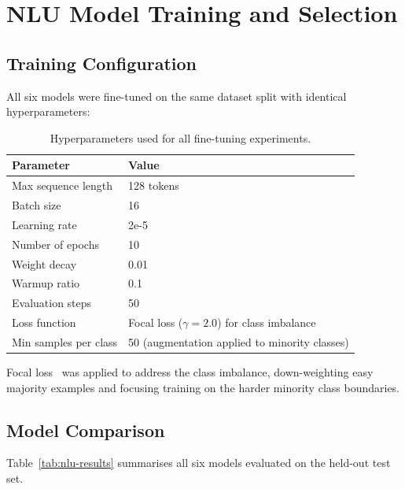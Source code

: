 \section{NLU Model Training and Selection}
\label{sec:results-nlu}

\subsection{Training Configuration}

All six models were fine-tuned on the same dataset split with identical
hyperparameters:

\begin{table}[H]
\centering
\caption{Hyperparameters used for all fine-tuning experiments.}
\label{tab:hyperparams}
\small
\begin{tabularx}{\textwidth}{Y Y}
\toprule
\textbf{Parameter} & \textbf{Value} \\
\midrule
Max sequence length    & 128 tokens \\
Batch size             & 16 \\
Learning rate          & 2e-5 \\
Number of epochs       & 10 \\
Weight decay           & 0.01 \\
Warmup ratio           & 0.1 \\
Evaluation steps       & 50 \\
Loss function          & Focal loss ($\gamma = 2.0$) for class imbalance \\
Min samples per class  & 50 (augmentation applied to minority classes) \\
\bottomrule
\end{tabularx}
\end{table}

\noindent Focal loss~\cite{lin2017} was applied to address the class imbalance, down-weighting easy majority examples and focusing training on the harder minority class boundaries.

\subsection{Model Comparison}

Table~\ref{tab:nlu-results} summarises all six models evaluated on the held-out
test set.

